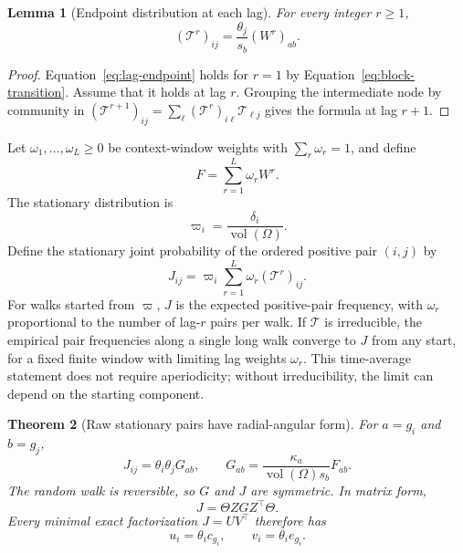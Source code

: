 \documentclass[aps,pre,reprint,superscriptaddress,longbibliography]{revtex4-2}
\DeclareMathOperator{\vol}{vol}
\newtheorem{theorem}{Theorem}
\newtheorem{lemma}[theorem]{Lemma}
\begin{document}
\begin{lemma}[Endpoint distribution at each lag]
\label{lem:lag-endpoint}
For every integer \(r\geq 1\),
\begin{equation}
    (\mathcal{T}^r)_{ij}
    =
    \frac{\theta_j}{s_b}(W^r)_{ab}.
    \label{eq:lag-endpoint}
\end{equation}
\end{lemma}

\begin{proof}
Equation~\eqref{eq:lag-endpoint} holds for \(r=1\) by Equation~\eqref{eq:block-transition}.
Assume that it holds at lag \(r\).
Grouping the intermediate node by community in
\((\mathcal{T}^{r+1})_{ij}=\sum_\ell(\mathcal{T}^r)_{i\ell}\mathcal{T}_{\ell j}\)
gives the formula at lag \(r+1\).
\end{proof}

Let \(\omega_1,\dots,\omega_L\geq 0\) be context-window weights with \(\sum_r \omega_r=1\), and define
\begin{equation}
    F=\sum_{r=1}^L \omega_rW^r.
    \label{eq:block-window}
\end{equation}
The stationary distribution is
\begin{equation}
    \varpi_i=\frac{\delta_i}{\vol(\Omega)}.
    \label{eq:stationary}
\end{equation}
Define the stationary joint probability of the ordered positive pair \((i,j)\) by
\begin{equation}
    J_{ij}
    =
    \varpi_i\sum_{r=1}^L \omega_r(\mathcal{T}^r)_{ij}.
    \label{eq:stationary-joint}
\end{equation}
For walks started from \(\varpi\), \(J\) is the expected positive-pair frequency, with \(\omega_r\) proportional to the number of lag-\(r\) pairs per walk.
If \(\mathcal{T}\) is irreducible, the empirical pair frequencies along a single long walk converge to \(J\) from any start, for a fixed finite window with limiting lag weights \(\omega_r\).
This time-average statement does not require aperiodicity; without irreducibility, the limit can depend on the starting component.

\begin{theorem}[Raw stationary pairs have radial-angular form]
\label{thm:raw-pair-rays}
For \(a=g_i\) and \(b=g_j\),
\begin{equation}
    J_{ij}
    =
    \theta_i\theta_jG_{ab},
    \qquad
    G_{ab}
    =
    \frac{\kappa_a}{\vol(\Omega)s_b}F_{ab}.
    \label{eq:J-factorization}
\end{equation}
The random walk is reversible, so \(G\) and \(J\) are symmetric.
In matrix form,
\begin{equation}
    J=\Theta ZGZ^\top\Theta.
    \label{eq:J-matrix}
\end{equation}
Every minimal exact factorization \(J=UV^\top\) therefore has
\begin{equation}
    u_i=\theta_i c_{g_i},
    \qquad
    v_i=\theta_i e_{g_i}.
    \label{eq:J-factor-rows}
\end{equation}
\end{theorem}
\end{document}
